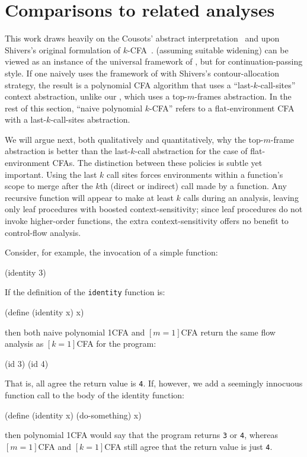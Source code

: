 \section{Comparisons to related analyses}
\label{sec:implementation}
\label{sec:related}

This work draws heavily on the Cousots' abstract
interpretation~\cite{mattmight:Cousot:1977:AI,mattmight:Cousot:1979:Galois} and upon Shivers's 
original formulation of $k$-CFA~\cite{mattmight:Shivers:1991:CFA}.
\nCFA{} (assuming suitable widening) can be viewed as an instance of
the universal framework of \citet{mattmight:Jagannathan:1995:Unified},
but for continuation-passing style.
If one naively uses the framework of
\citet{mattmight:Jagannathan:1995:Unified} with Shivers's \kCFA{}
contour-allocation strategy, the result is a polynomial CFA algorithm
that uses a ``last-$k$-call-sites'' context abstraction, unlike our
\nCFA{}, which uses a top-$m$-frames abstraction.
In the rest of this section, ``naive polynomial $k$-CFA'' refers to a
flat-environment CFA with a last-$k$-call-sites abstraction.


We will argue next, both qualitatively and quantitatively,
why the top-$m$-frame abstraction is better than the last-$k$-call
abstraction for the case of flat-environment CFAs.
The distinction between these policies is subtle yet
important.
Using the last $k$ call sites forces environments within a function's
scope to merge after the $k$th (direct or indirect) call made by a
function.
Any recursive function will appear to make at least $k$ calls during
an analysis, leaving only leaf procedures with boosted
context-sensitivity; since leaf procedures do not invoke higher-order
functions, the extra context-sensitivity offers no benefit to
control-flow analysis.


Consider, for example, the invocation of a simple 
function:
\begin{code}
(identity 3)\end{code}
If the definition of the {\tt identity} function is:
\begin{code}
(define (identity x) x)\end{code}
then both naive polynomial 1CFA and $[m=1]$CFA return the same flow analysis
as $[k=1]$CFA for the program:
\begin{code}
(id 3)
(id 4)\end{code}
That is, all agree the return value is {\tt 4}.
If, however, we add a seemingly innocuous function call to the body of the identity function:
\begin{code}
(define (identity x)
        (do-something)
        x)\end{code} 
then polynomial 1CFA would say that the program returns {\tt 3} or {\tt 4}, 
whereas $[m=1]$CFA and $[k=1]$CFA still agree that the return value is just {\tt 4}.

